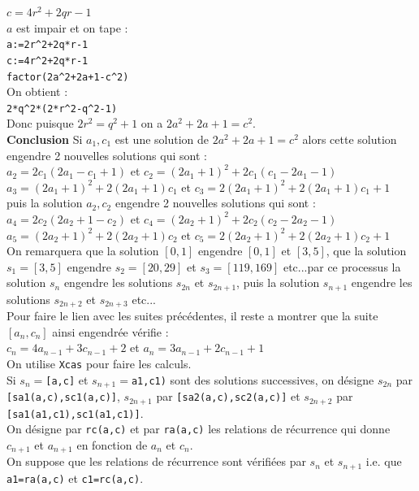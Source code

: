 \documentclass[a4paper,11pt]{book}
\begin{document}
\begin{enumerate}
$c=4r^2+2qr-1$\\
$a$ est impair et on tape :\\
{\tt a:=2r\verb|^|2+2q*r-1}\\
{\tt c:=4r\verb|^|2+2q*r-1}\\
{\tt factor(2a\verb|^|2+2a+1-c\verb|^|2)}\\
On obtient :\\
{\tt 2*q\verb|^|2*(2*r\verb|^|2-q\verb|^|2-1)}\\
Donc puisque $2r^2=q^2+1$ on a $2a^2+2a+1=c^2$.\\
{\bf Conclusion}
Si  $a_1,c_1$ est une solution de $2a^2+2a+1=c^2$ alors cette solution engendre
2 nouvelles solutions qui sont :\\
$a_2=2c_1(2a_1-c_1+1)$ et $c_2=(2a_1+1)^2+2c_1(c_1-2a_1-1)$\\
$a_3=(2a_1+1)^2+2(2a_1+1)c_1$ et $c_3=2(2a_1+1)^2+2(2a_1+1)c_1+1$\\
puis la solution $a_2,c_2$ engendre 2 nouvelles solutions qui sont :\\
$a_4=2c_2(2a_2+1-c_2)$ et $c_4=(2a_2+1)^2+2c_2(c_2-2a_2-1)$\\
$a_5=(2a_2+1)^2+2(2a_2+1)c_2$ et $c_5=2(2a_2+1)^2+2(2a_2+1)c_2+1$\\
On remarquera que la solution $[0,1]$ engendre $[0,1]$ et $[3,5]$, que la 
solution $s_1=[3,5]$ engendre $s_2=[20,29]$ et $s_3=[119,169]$ etc...par ce 
processus la solution $s_n$ engendre les solutions $s_{2n}$ et $s_{2n+1}$, puis 
la solution $s_{n+1}$ engendre les solutions $s_{2n+2}$ et $s_{2n+3}$ etc...\\
Pour faire le lien avec les suites pr\'ec\'edentes, il reste a montrer que la 
suite $[a_n,c_n]$ ainsi engendr\'ee v\'erifie :\\
$c_n=4a_{n-1}+3c_{n-1}+2$ et $a_n=3a_{n-1}+2c_{n-1}+1$\\
On utilise {\tt Xcas} pour faire les calculs.\\
Si $s_n=${\tt [a,c]} et $s_{n+1}=${\tt a1,c1)} sont des solutions successives, 
on d\'esigne $s_{2n}$ par {\tt [sa1(a,c),sc1(a,c)]}, $s_{2n+1}$ par {\tt [sa2(a,c),sc2(a,c)]} et $s_{2n+2}$ par {\tt [sa1(a1,c1),sc1(a1,c1)]}.\\
On d\'esigne par {\tt rc(a,c)} et par {\tt ra(a,c)} les relations de 
r\'ecurrence qui donne $c_{n+1}$ et $a_{n+1}$ en fonction de $a_n$ et $c_n$.\\
On suppose que les relations de r\'ecurrence sont v\'erifi\'ees par $s_n$ et 
$s_{n+1}$ i.e. que {\tt a1=ra(a,c)} et {\tt c1=rc(a,c)}.\\

\end{enumerate}
\end{document}
